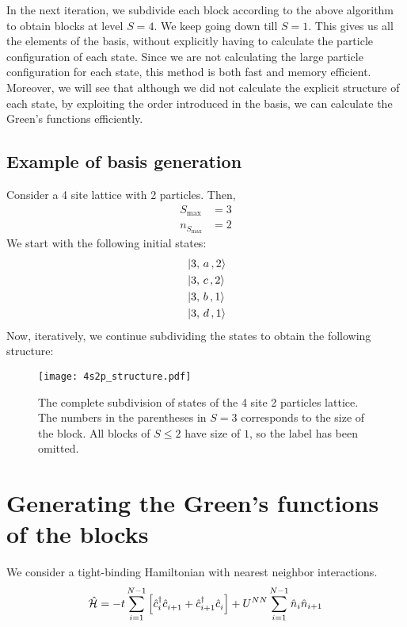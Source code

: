 	In the next iteration, we subdivide each block according to the above algorithm to obtain blocks at level $ S=4 $. We keep going down till $ S=1 $. This gives us all the elements of the basis, without explicitly having to calculate the particle configuration of each state. Since we are not calculating the large particle configuration for each state, this method is both fast and memory efficient. Moreover, we will see that although we did not calculate the explicit structure of each state, by exploiting the order introduced in the basis, we can calculate the Green's functions efficiently.
	
	\subsection*{Example of basis generation}
	Consider a 4 site lattice with 2 particles. Then,
	\begin{align*}
		S_{\mathrm{max}} &= 3\\
		n_{S_{\mathrm{max}}} &= 2
	\end{align*}
	We start with the following initial states:
	\begin{align*}
		&\ket{3, \,a\,, 2}\\
		&\ket{3, \,c\,, 2}\\
		&\ket{3, \,b\,, 1}\\
		&\ket{3, \,d\,, 1}
	\end{align*}
	Now, iteratively, we continue subdividing the states to obtain the following structure:
	\begin{figure}[h!]
		\centering
		\texttt{[image: 4s2p\_structure.pdf]}
		\caption{The complete subdivision of states of the 4 site 2 particles lattice. The numbers in the parentheses in $ S=3 $ corresponds to the size of the block. All blocks of $ S \le 2 $ have size of $ 1 $, so the label has been omitted.}
		\label{fig:4s2p_structure}
	\end{figure}

\section{Generating the Green's functions of the blocks}
	We consider a tight-binding Hamiltonian with nearest neighbor interactions.
	\begin{align}\label{eqn:spinlessH}
		\hat{\mathcal{H}} = -t \sum_{i = 1}^{N-1} \left[ \hat{c}^{\dagger}_{i} \hat{c}^{}_{i+1} + \hat{c}^{\dagger}_{i+1} \hat{c}^{}_{i}\right] + U^{NN}\sum_{i=1}^{N-1} \hat{n}_i \hat{n}_{i+1}
	\end{align}
	
